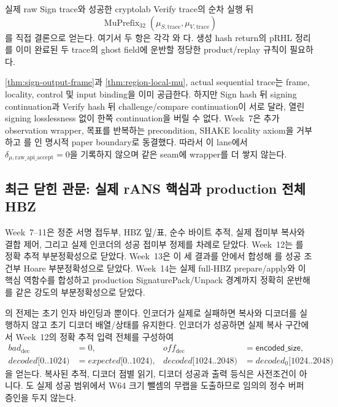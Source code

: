 \begin{obligation}
실제 raw Sign trace와 성공한 cryptolab Verify trace의 순차 실행 뒤
\[
  \operatorname{MuPrefix}_{32}
  (\mu_{S,\mathrm{trace}},\mu_{V,\mathrm{trace}})
\]
를 직접 결론으로 얻는다. 여기서 두 항은 각각
와
다. 생성 hash return의 pRHL
정리를 이미 완료된 두 trace의 ghost field에 운반할 정당한 product/replay
규칙이 필요하다.
\end{obligation}

\cref{thm:sign-output-frame}과 \cref{thm:region-local-mu}, actual sequential trace는
frame, locality, control 및 input binding을 이미 공급한다. 하지만 Sign hash 뒤
signing continuation과 Verify hash 뒤 challenge/compare continuation이 서로
달라, 열린 signing losslessness 없이 한쪽 continuation을 버릴 수 없다. Week~7은
추가 observation wrapper, 목표를 반복하는 precondition, SHAKE locality axiom을
거부하고 를 \statusdeferred 인 명시적 paper
boundary로 동결했다. 따라서 이 lane에서
\(\delta_{\mu,\mathrm{raw\_api\_accept}}=0\)을 기록하지 않으며 같은 seam에
wrapper를 더 쌓지 않는다.

\subsection{최근 닫힌 관문: 실제 rANS 핵심과 production 전체 HBZ}

Week~7--11은 정준 서명 접두부, HBZ 잎/표, 순수 바이트 추적, 실제 접미부 복사와
결합 제어, 그리고 실제 인코더의 성공 접미부 정제를 차례로 닫았다. Week~12는
를 정확 추적 부분정확성으로 닫았다. Week~13은
이 세 결과를  안에서 합성해
를 성공 조건부 Hoare 부분정확성으로 닫았다.
Week~14는 실제 full-HBZ prepare/apply와 이 핵심 역함수를 합성하고 production
SignaturePack/Unpack 경계까지 정확히 운반해
를 같은 강도의 부분정확성으로 닫았다.

의 전제는 초기 인자
바인딩과 뿐이다. 인코더가 실제로 실패하면
복사와 디코더를 실행하지 않고 초기 디코더 배열/상태를 유지한다. 인코더가
성공하면 실제 복사 구간에서 Week~12의 정확 추적 입력 전체를 구성하여
\[
\begin{aligned}
  bad_{\mathrm{dec}}&=0,&
  off_{\mathrm{dec}}&=\mathsf{encoded\_size},\\
  decoded[0..1024)&=expected[0..1024),&
  decoded[1024..2048)&=decoded_0[1024..2048)
\end{aligned}
\]
을 얻는다. 복사된 추적, 디코더 점별 읽기, 디코더 성공과 출력 등식은
사전조건이 아니다. 도 실제 성공
범위에서 W64 크기 뺄셈의 무랩을 도출하므로 임의의 정수 버퍼 증인을 두지
않는다.

